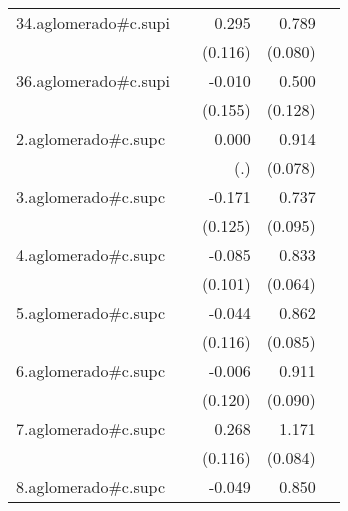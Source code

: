 {\begin{longtable}{l*{4}{D{.}{.}{-1}}}
\addlinespace
34.aglomerado#c.supi&                     &       0.295\sym{*}  &       0.789\sym{***}&                     \\
            &                     &     (0.116)         &     (0.080)         &                     \\
\addlinespace
36.aglomerado#c.supi&                     &      -0.010         &       0.500\sym{***}&                     \\
            &                     &     (0.155)         &     (0.128)         &                     \\
\addlinespace
2.aglomerado#c.supc&                     &       0.000         &       0.914\sym{***}&                     \\
            &                     &         (.)         &     (0.078)         &                     \\
\addlinespace
3.aglomerado#c.supc&                     &      -0.171         &       0.737\sym{***}&                     \\
            &                     &     (0.125)         &     (0.095)         &                     \\
\addlinespace
4.aglomerado#c.supc&                     &      -0.085         &       0.833\sym{***}&                     \\
            &                     &     (0.101)         &     (0.064)         &                     \\
\addlinespace
5.aglomerado#c.supc&                     &      -0.044         &       0.862\sym{***}&                     \\
            &                     &     (0.116)         &     (0.085)         &                     \\
\addlinespace
6.aglomerado#c.supc&                     &      -0.006         &       0.911\sym{***}&                     \\
            &                     &     (0.120)         &     (0.090)         &                     \\
\addlinespace
7.aglomerado#c.supc&                     &       0.268\sym{*}  &       1.171\sym{***}&                     \\
            &                     &     (0.116)         &     (0.084)         &                     \\
\addlinespace
8.aglomerado#c.supc&                     &      -0.049         &       0.850\sym{***}&                     \\

\end{longtable}}
